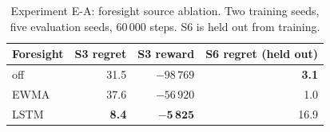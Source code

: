 
\begin{table}[t]
\caption{Experiment E-A: foresight source ablation. Two training seeds,
five evaluation seeds, 60\,000 steps. S6 is held out from training.}
\label{tab:ea}
\centering
\begin{tabular}{lrrr}
\hline
Foresight & S3 regret & S3 reward & S6 regret (held out) \\
\hline
off   & 31.5 & $-98\,769$ & \textbf{3.1} \\
EWMA  & 37.6 & $-56\,920$ & 1.0 \\
LSTM  & \textbf{8.4}  & $\mathbf{-5\,825}$ & 16.9 \\
\hline
\end{tabular}
\end{table}
